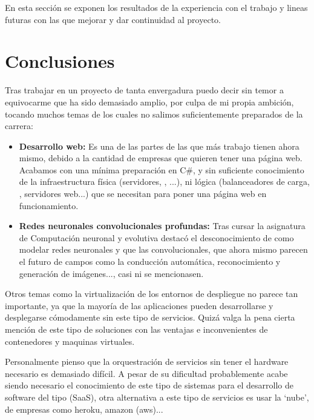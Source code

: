
En esta sección se exponen los resultados de la experiencia con el trabajo y lineas futuras con las que mejorar y dar continuidad al proyecto.

\section{Conclusiones}

Tras trabajar en un proyecto de tanta envergadura puedo decir sin temor a equivocarme que ha sido demasiado amplio, por culpa de mi propia ambición, tocando muchos temas de los cuales no salimos suficientemente preparados de la carrera:

\begin{itemize}
\item \textbf{Desarrollo web:} Es una de las partes de las que más trabajo tienen ahora mismo, debido a la cantidad de empresas que quieren tener una página web. Acabamos con una mínima preparación en C\#, y sin suficiente conocimiento de la infraestructura física (servidores, , ...), ni lógica (balanceadores de carga, , servidores web...) que se necesitan para poner una página web en funcionamiento.
\item \textbf{Redes neuronales convolucionales profundas:} Tras cursar la asignatura de Computación neuronal y evolutiva destacó el desconocimiento de como modelar redes neuronales y que las convolucionales, que ahora mismo parecen el futuro de campos como la conducción automática, reconocimiento y generación de imágenes..., casi ni se mencionasen.
\end{itemize}

Otros temas como la virtualización de los entornos de despliegue no parece tan importante, ya que la mayoría de las aplicaciones pueden desarrollarse y desplegarse cómodamente sin este tipo de servicios. Quizá valga la pena cierta mención de este tipo de soluciones con las ventajas e inconvenientes de contenedores y maquinas virtuales. 

Personalmente pienso que la orquestración de servicios sin tener el hardware necesario es demasiado difícil. A pesar de su dificultad probablemente acabe siendo necesario el conocimiento de este tipo de sistemas para el desarrollo de software del tipo  (SaaS), otra alternativa a este tipo de servicios es usar la `nube', de empresas como heroku, amazon (aws)...

